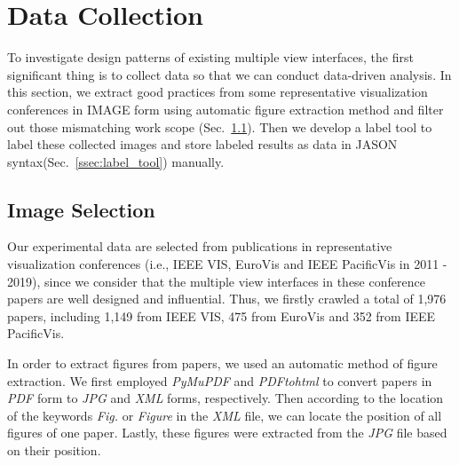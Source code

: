 \section{Data Collection}
\label{sec:data}


To investigate design patterns of existing multiple view interfaces, the first significant thing is to collect data so that we can conduct data-driven analysis. 
In this section, we extract good practices from some representative visualization conferences in IMAGE form using automatic figure extraction method and filter out those mismatching work scope (Sec.~\ref{ssec:mv_collection}). Then we develop a label tool to label these collected images and store labeled results as data in JASON syntax(Sec.~\ref{ssec:label_tool}) manually.


\subsection{Image Selection}
\label{ssec:mv_collection}


Our experimental data are selected from publications in representative visualization conferences (i.e., IEEE VIS, EuroVis and IEEE PacificVis in 2011 - 2019), since we consider that the multiple view interfaces in these conference papers are well designed and influential.
Thus, we firstly crawled a total of 1,976 papers, including 1,149 from IEEE VIS, 475 from EuroVis and 352 from IEEE PacificVis. 

In order to extract figures from papers, we used an automatic method of figure extraction. 
We first employed \textit{PyMuPDF} 
and \textit{PDFtohtml} 
to convert papers in \textit{PDF} form to \textit{JPG} and \textit{XML} forms, respectively. 
Then according to the location of the keywords \emph{Fig.} or \emph{Figure} in the \textit{XML} file, we can locate the position of all figures of one paper. 
Lastly, these figures were extracted from the \textit{JPG} file based on their position.


